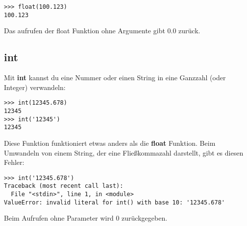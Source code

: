 \begin{Verbatim}[frame=single]
>>> float(100.123)
100.123
\end{Verbatim}

\noindent
Das aufrufen der float Funktion ohne Argumente gibt 0.0 zurück.

\subsection*{int}

Mit \textbf{int} kannst du eine Nummer oder einen String in eine Ganzzahl (oder Integer) verwandeln:

\begin{Verbatim}[frame=single]
>>> int(12345.678)
12345
>>> int('12345')
12345
\end{Verbatim}

Diese Funktion funktioniert etwas anders als die \textbf{float} Funktion. Beim Umwandeln von einem String, der eine Fließkommazahl darstellt, gibt es diesen Fehler:

\begin{Verbatim}[frame=single]
>>> int('12345.678')
Traceback (most recent call last):
  File "<stdin>", line 1, in <module>
ValueError: invalid literal for int() with base 10: '12345.678'
\end{Verbatim}

\noindent
Beim Aufrufen ohne Parameter wird 0 zurückgegeben.

